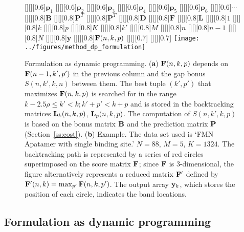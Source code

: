 \begin{figure}
\centering
	[][][0.6]{$\mathbf{p}_1$}
	[][][0.6]{$\mathbf{p}_2$}
	[][][0.6]{$\mathbf{p}_3$}
	[][][0.6]{$\mathbf{p}_4$}
	[][][0.6]{$\mathbf{p}_5$}
	[][][0.6]{$\mathbf{p}_6$}				
	[][][0.6]{$\cdots$}				
	[][][0.8]{$\mathbf{B}$}
	[][][0.8]{$\mathbf{P}^T$}
	[][][0.8]{$\mathbf{P}^T$}
	[][][0.8]{$\mathbf{D}$}
	[][][0.8]{$\mathbf{F}$}
	[][][0.8]{$\mathbf{L}$}
	[][][0.8]{$1$}
	[][][0.8]{$k$}
	[][][0.8]{$p$}
	[][][0.8]{$K$}
	[][][0.8]{$k'$}
	[][][0.8]{$M$}
	[][][0.8]{$n$}
	[][][0.8]{$n-1$}
	[][][0.8]{$N$}
	[][][0.8]{$\mathbf{y}$}
	[][][0.8]{${\mathbf{F}}(n,k,p)$}
	[][][0.7]{}
	[][][0.7]{}
\texttt{[image: ../figures/method\_dp\_formulation]}
\caption{Formulation as dynamic programming. (\textbf{a}) ${\mathbf{F}}(n,k,p)$ depends on ${\mathbf{F}}(n-1,k',p')$ in the previous column and the gap bonus $S(n,k',k,n)$ between them. The best tuple $(k',p')$ that maximizes ${\mathbf{F}}(n,k,p)$ is searched for in the range $k-2.5\rho \le k' < k; k'+p' < k+p$ and is stored in the backtracking matrices ${\mathbf{L}}_k(n,k,p)$, ${\mathbf{L}}_p(n,k,p)$. The computation of $S(n,k',k,p)$ is based on the bonus matrix ${\mathbf{B}}$ and the prediction matrix ${\mathbf{P}}$ (Section~\ref{ss:cost}). (\textbf{b}) Example. The data set used is `FMN Apatamer with single binding site.' $N=88$, $M=5$, $K=1324$. The backtracking path is represented by a series of red circles superimposed on the score matrix ${\mathbf{F}}$; since ${\mathbf{F}}$ is 3-dimensional, the figure alternatively represents a reduced matrix ${\mathbf{F}}'$ defined by ${\mathbf{F}}'(n,k)=\max_{p'} {\mathbf{F}}(n,k,p')$. The output array ${\mathbf{y}}_k$, which stores the position of each circle, indicates the band locations.}
\label{f:dp-formulation}
\end{figure}

\subsection{Formulation as dynamic programming}

